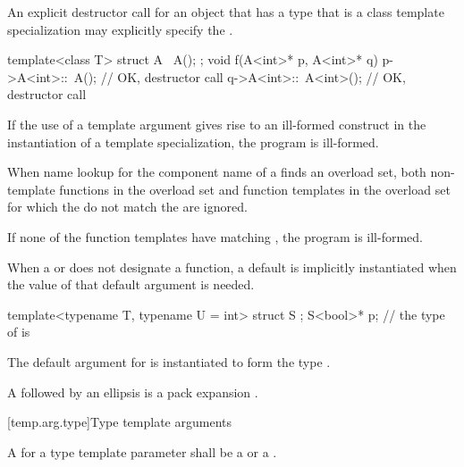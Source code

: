 \documentclass{wg21}
\begin{document}
\pnum
An explicit destructor call  for an object that has a type
that is a class template specialization may explicitly specify the
.
\begin{example}
    \begin{codeblock}
        template<class T> struct A {
            ~A();
        };
        void f(A<int>* p, A<int>* q) {
            p->A<int>::~A();              // OK, destructor call
            q->A<int>::~A<int>();         // OK, destructor call
        }
    \end{codeblock}
\end{example}

\pnum
If the use of a template argument
gives rise to an ill-formed construct in the instantiation of a
template specialization, the program is ill-formed.

\pnum
When name lookup for the component name of a
finds an overload set, both non-template functions in the overload
set and function templates in the overload set for
which the
do not match the
are ignored.
\begin{note}
    If none of the function templates have matching
    ,
    the program is ill-formed.
\end{note}

\pnum
When a  or
does not designate a function,
a default  is
implicitly instantiated 
when the value of that default argument is needed.
\begin{example}
    \begin{codeblock}
        template<typename T, typename U = int> struct S { };
        S<bool>* p;         // the type of  is 
    \end{codeblock}
    The default argument for  is instantiated to form the type .
\end{example}

\pnum
A  followed by an ellipsis is
a pack expansion .

[temp.arg.type]{Type template arguments}

\pnum
A
for a type template parameter
shall be a
 or a .
\end{document}
